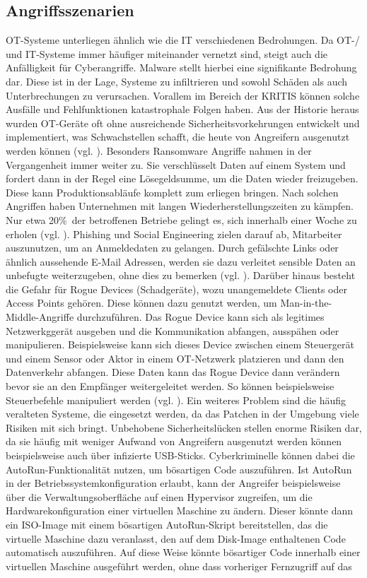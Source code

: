 \subsection{Angriffsszenarien}

OT-Systeme unterliegen ähnlich wie die IT verschiedenen Bedrohungen. Da OT-/ und IT-Systeme immer häufiger miteinander vernetzt sind, steigt auch die Anfälligkeit für Cyberangriffe. Malware stellt hierbei eine signifikante Bedrohung dar. Diese ist in der Lage, Systeme zu infiltrieren und sowohl Schäden als auch Unterbrechungen zu verursachen. Vorallem im Bereich der KRITIS können solche Ausfälle und Fehlfunktionen katastrophale Folgen haben. Aus der Historie heraus wurden OT-Geräte oft ohne ausreichende Sicherheitsvorkehrungen entwickelt und implementiert, was Schwachstellen schafft, die heute von Angreifern ausgenutzt werden können (vgl. \cite{avast}). Besonders Ransomware Angriffe nahmen in der Vergangenheit immer weiter zu. Sie verschlüsselt Daten auf einem System und fordert dann in der Regel eine Lösegeldsumme, um die Daten wieder freizugeben. Diese kann Produktionsabläufe komplett zum erliegen bringen. Nach solchen Angriffen haben Unternehmen mit langen Wiederherstellungszeiten zu kämpfen. Nur etwa 20\%\ der betroffenen Betriebe gelingt es, sich innerhalb einer Woche zu  erholen (vgl. \cite{secin}). Phishing und Social Engineering zielen darauf ab, Mitarbeiter auszunutzen, um an Anmeldedaten zu gelangen. Durch gefälschte Links oder ähnlich aussehende E-Mail Adressen, werden sie dazu verleitet sensible Daten an unbefugte weiterzugeben, ohne dies zu bemerken (vgl. \cite{bsibund}). \clearpage \noindent Darüber hinaus besteht die Gefahr für Rogue Devices (Schadgeräte), wozu unangemeldete Clients oder Access Points gehören. Diese können dazu genutzt werden, um Man-in-the-Middle-Angriffe durchzuführen. Das Rogue Device kann sich als legitimes Netzwerkggerät ausgeben und die Kommunikation abfangen, ausspähen oder manipulieren. Beispielsweise kann sich dieses Device zwischen einem Steuergerät und einem Sensor oder Aktor in einem OT-Netzwerk platzieren und dann den Datenverkehr abfangen. Diese Daten kann das Rogue Device dann verändern bevor sie an den Empfänger weitergeleitet werden. So können beispielsweise Steuerbefehle manipuliert werden (vgl. \cite{securityInsider3}). Ein weiteres Problem sind die häufig veralteten Systeme, die eingesetzt werden, da das Patchen in der Umgebung viele Risiken mit sich bringt. Unbehobene Sicherheitslücken stellen enorme Risiken dar, da sie häufig mit weniger Aufwand von Angreifern ausgenutzt werden können beispielsweise auch über infizierte USB-Sticks. Cyberkriminelle können dabei die AutoRun-Funktionalität nutzen, um bösartigen Code auszuführen. Ist AutoRun in der Betriebssystemkonfiguration erlaubt, kann der Angreifer beispielsweise über die Verwaltungsoberfläche auf einen Hypervisor zugreifen, um die Hardwarekonfiguration einer virtuellen Maschine zu ändern. Dieser könnte dann ein ISO-Image mit einem bösartigen AutoRun-Skript bereitstellen, das die virtuelle Maschine dazu veranlasst, den auf dem Disk-Image enthaltenen Code automatisch auszuführen. Auf diese Weise könnte bösartiger Code innerhalb einer virtuellen Maschine ausgeführt werden, ohne dass vorheriger Fernzugriff auf das 